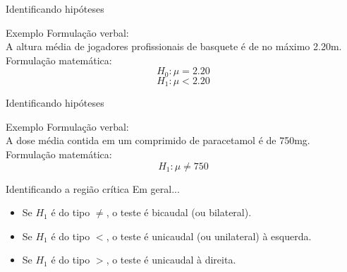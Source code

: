 \documentclass{beamer}
\begin{document}
\begin{frame}{Identificando hipóteses}
  \begin{exampleblock}{Exemplo}
    Formulação verbal:\\
    A altura média de jogadores profissionais de basquete é de no
    máximo 2.20m.\\
    \bigskip
    Formulação matemática:\\
    \begin{displaymath}
      H_0: \mu = 2.20
    \end{displaymath}
    \begin{displaymath}
      H_1: \mu < 2.20
    \end{displaymath}
  \end{exampleblock}
\end{frame}

\begin{frame}{Identificando hipóteses}
  \begin{exampleblock}{Exemplo}
    Formulação verbal:\\
    A dose média contida em um comprimido de paracetamol é de 750mg.\\
    \bigskip
    Formulação matemática:\\
    \begin{displaymath}
      H_1: \mu \ne 750
    \end{displaymath}
  \end{exampleblock}
  \begin{center}
  \end{center}
\end{frame}

\begin{frame}{Identificando a região crítica}
  Em geral...
  \begin{itemize}
  \item Se $H_1$ é do tipo $\ne$, o teste é bicaudal (ou bilateral).
  \item Se $H_1$ é do tipo $<$, o teste é unicaudal (ou unilateral) à esquerda.
  \item Se $H_1$ é do tipo $>$, o teste é unicaudal à direita.
  \end{itemize}
\end{frame}
\end{document}

